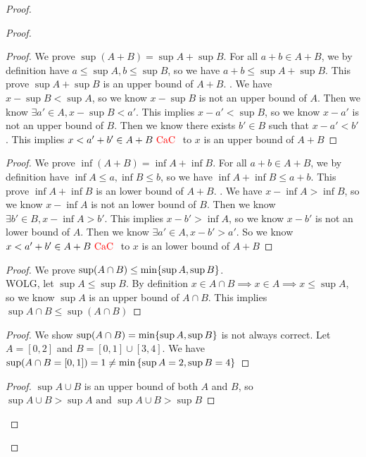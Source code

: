 \documentclass{report}
\begin{document}
\begin{proof}
\begin{proof}
\begin{question}{}{}
\begin{enumerate}
\end{enumerate}
\end{question}
\begin{proof}
We prove $\sup (A+B)=\sup A+\sup B$. For all $a+b \in A+B$, we by definition have $a\leq \sup A, b\leq \sup B$, so we have $a+b\leq \sup A+\sup B$. This prove $\sup A+\sup B$ is an upper bound of $A+B$. . We have $x-\sup B<\sup A$, so we know $x-\sup B$ is not an upper bound of $A$. Then we know  $\exists a'\in A, x-\sup B<a'$. This implies $x-a'< \sup B$, so we know $x-a'$ is not an upper bound of  $B$. Then we know there exists  $b' \in B$ such that $x-a'< b'$. This implies $x<a'+b' \in A+B\text{ \textcolor{red}{CaC} }$ to $x$ is an upper bound of  $A+B$
\end{proof}
\begin{proof}
We prove $\inf (A+B)= \inf A +\inf B$. For all $a+b \in A+B$, we by definition have $\inf A\leq a,\inf B\leq b$, so we have $\inf A+\inf B\leq a+b$. This prove $\inf A+ \inf B$ is an lower bound of $A+B$.  . We have $x- \inf A > \inf B$, so we know $x - \inf A$ is not an lower bound of $B$. Then we know  $\exists b' \in B, x- \inf A > b'$. This implies $x-b'>\inf A$, so we know $x- b'$ is not an lower bound of $A$. Then we know  $\exists a' \in A, x-b'>a'$. So we know $x<a'+b' \in A+B\text{ \textcolor{red}{CaC} }$ to $x$ is an lower bound of $A+B$ 
\end{proof}
\begin{proof}
We prove $\sup (A\cap B)\leq \min \{ \sup A,\sup  B \}$.\\

WOLG, let $\sup A\leq \sup B$. By definition $x \in A\cap B \implies  x \in A \implies x\leq \sup A$, so we know $\sup A$ is an upper bound of $A\cap B$. This implies $\sup A\cap B\leq \sup (A\cap B)$ 
\end{proof}
\begin{proof}
We show $\sup (A\cap B)= \min \{ \sup A,\sup B \}$ is not always correct. Let $A=[0,2]$ and $B=[0,1]\cup [3,4]$. We have $\sup (A\cap B= [0,1])=1\neq \min{\{ \sup A=2,\sup B=4 \}}$
\end{proof}
\begin{proof}
$\sup A\cup B$ is an upper bound of both $A$ and  $B$, so  $\sup A\cup B>\sup A\text{ and }\sup A\cup B>\sup B$


\end{proof}
\end{proof}
\end{proof}
\end{document}
